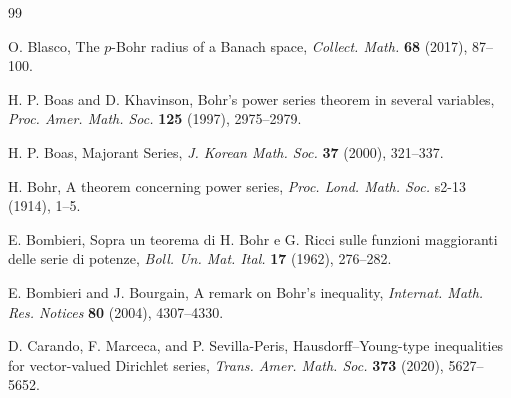\documentclass[a4paper,11pt, reqno]{amsart}
\theoremstyle{definition}
\begin{document}
\begin{thebibliography}{99}
	
	
	 {\sc O. Blasco}, The $p$-Bohr radius of a Banach space, {\it Collect. Math.} {\bf 68} (2017), 87--100.
	
	
	 {\sc H. P. Boas} and {\sc D. Khavinson}, Bohr's power series theorem in several variables, {\it Proc. Amer. Math. Soc.}  {\bf 125} (1997), 2975--2979.
	
	 {\sc H. P. Boas}, Majorant Series,  {\it J. Korean Math. Soc.}  {\bf 37} (2000), 321--337.
	
	 {\sc H. Bohr}, A theorem concerning power series,  {\it Proc. Lond. Math. Soc.} s2-13 (1914), 1--5.
	
	 {\sc E. Bombieri}, Sopra un teorema di H. Bohr e G. Ricci sulle funzioni maggioranti delle serie di potenze, {\it Boll. Un. Mat. Ital.} {\bf 17} (1962), 276--282.
	
	 {\sc E. Bombieri} and {\sc J. Bourgain}, A remark on Bohr's inequality, {\it Internat. Math. Res. Notices} {\bf 80} (2004), 4307--4330.
	
	
	
	 {\sc D. Carando, F. Marceca}, and {\sc P. Sevilla-Peris}, Hausdorff–Young-type inequalities for vector-valued Dirichlet series, {\it Trans. Amer. Math. Soc.} {\bf 373} (2020), 5627--5652.
	
	

\end{thebibliography}
\end{document}
